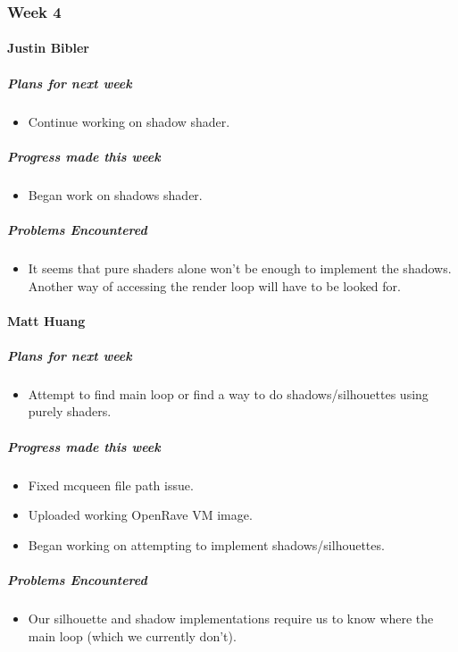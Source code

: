 \newpage

{
\subsubsection{Week 4}
\paragraph{Justin Bibler}
\subparagraph{Plans for next week}
\begin{itemize}
  \item Continue working on shadow shader.
\end{itemize}

\subparagraph{Progress made this week}
\begin{itemize}
  \item Began work on shadows shader.
\end{itemize}

\subparagraph{Problems Encountered}
\begin{itemize}
  \item It seems that pure shaders alone won't be enough to implement the shadows. Another way of accessing the render loop will have to be looked for.
\end{itemize}
\vspace{3mm}

\paragraph{Matt Huang}
\subparagraph{Plans for next week}
\begin{itemize}
  \item Attempt to find main loop or find a way to do shadows/silhouettes using purely shaders.
\end{itemize}

\subparagraph{Progress made this week}
\begin{itemize}
  \item Fixed mcqueen file path issue.
  \item Uploaded working OpenRave VM image.
  \item Began working on attempting to implement shadows/silhouettes.
\end{itemize}

\subparagraph{Problems Encountered}
\begin{itemize}
  \item Our silhouette and shadow implementations require us to know where the main loop (which we currently don't).
\end{itemize}

}
